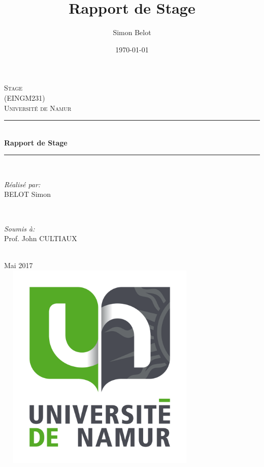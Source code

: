 \documentclass[a4paper, 12pt, french]{article}
\title{Rapport de Stage}
\author{Simon Belot}
\date{\today}
\begin{document}
\begin{titlepage}

\newcommand{\HRule}{\rule{\linewidth}{0.5mm}} 

\center 
 
\textsc{\LARGE Stage}\\[0.5cm] 
\textsc{\LARGE (EINGM231)} \\[0.3cm] 
\textsc{\Large Université de Namur }\\[0.3cm]

\HRule \\[0.4cm]
{ \huge \bfseries Rapport de Stage}\\[0.03cm] 
\HRule \\[1.5cm]

\begin{minipage}{0.4\textwidth}
\begin{flushleft} \large
\emph{Réalisé par:}\\BELOT Simon
\end{flushleft}
\end{minipage}
~
\begin{minipage}{0.4\textwidth}
\begin{flushright} \large
\emph{Soumis à:}\\ Prof. John CULTIAUX
\end{flushright}
\end{minipage}\\[1cm]

{\large Mai 2017}\\

\includegraphics[width=10cm, height=10cm]{logounamur.png}\\ 

\vfill

\end{titlepage}
\end{document}
